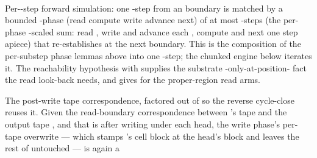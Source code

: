 \begin{isabellebody}
\ \ \isamarkupfalse%
\isanewline
{}\isamarkupfalse%
%
\endisatagproof
{\isafoldproof}%
%
\isadelimproof
%
\endisadelimproof
%
\begin{isamarkuptext}%
Per--step forward simulation: one -step
   from an  boundary is matched by a
  bounded -phase (read \isa{{\isasymrightarrow}} compute \isa{{\isasymrightarrow}} write
  \isa{{\isasymrightarrow}} advance \isa{{\isasymrightarrow}} next) of at most  -steps (the per-phase -scaled
  sum: read , write and advance each
  , compute and next one step apiece) that
  re-establishes  at the next boundary.  This is the
  composition of the per-substep phase lemmas above into one
  -step; the chunked engine below iterates it.  The
  reachability hypothesis  with  supplies
  the substrate -only-at-position- fact the read
  look-back needs, and  gives 
  for the proper-region read arms.%
\end{isamarkuptext}\isamarkuptrue%
%
\begin{isamarkuptext}%
The post-write tape correspondence, factored out of
   so the reverse cycle-close reuses
  it.  Given the
  read-boundary correspondence between 's tape and the output
  tape , and that  is  after writing
   under each head, the write phase's per-tape overwrite
   — which stamps 's cell block at the head's
  block and leaves the rest of  untouched — is again a

\end{isamarkuptext}
\end{isabellebody}
